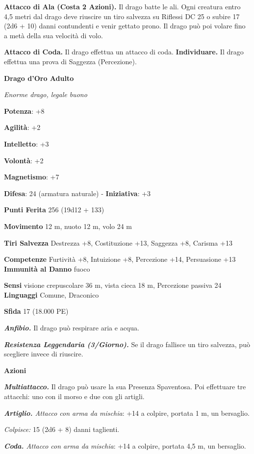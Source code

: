 \begin{multicols}{2}
\textbf{Attacco di Ala (Costa 2 Azioni).} Il drago batte le ali. Ogni
creatura entro 4,5 metri dal drago deve riuscire un tiro salvezza su Riflessi DC 25 o subire 17 (2d6 + 10) danni contundenti e venir gettato
prono. Il drago può poi volare fino a metà della sua velocità di volo.

\textbf{Attacco di Coda.} Il drago effettua un attacco di coda.
\textbf{Individuare.} Il drago effettua una prova di Saggezza
(Percezione).



\textbf{Drago d'Oro Adulto}

\emph{Enorme drago, legale buono}

\textbf{Potenza}: +8

\textbf{Agilità}: +2

\textbf{Intelletto}: +3

\textbf{Volontà}: +2

\textbf{Magnetismo}: +7

\textbf{Difesa}: 24 (armatura naturale) - \textbf{Iniziativa}: +3

\textbf{Punti Ferita} 256 (19d12 + 133)

\textbf{Movimento} 12 m, nuoto 12 m, volo 24 m

\textbf{Tiri Salvezza} Destrezza +8, Costituzione +13, Saggezza +8,
Carisma +13

\textbf{Competenze} Furtività +8, Intuizione +8, Percezione +14,
Persuasione +13 \textbf{Immunità al Danno} fuoco

\textbf{Sensi} visione crepuscolare 36 m, vista cieca 18 m, Percezione passiva
24 \textbf{Linguaggi} Comune, Draconico

\textbf{Sfida} 17 (18.000 PE)\smallskip

\emph{\textbf{Anfibio.}} Il drago può respirare aria e acqua.

\emph{\textbf{Resistenza Leggendaria (3/Giorno).}} Se il drago fallisce
un tiro salvezza, può scegliere invece di riuscire.

\smallskip\textbf{Azioni}

\emph{\textbf{Multiattacco.}} Il drago può usare la sua Presenza
Spaventosa. Poi effettuare tre attacchi: uno con il morso e due con gli
artigli.

\emph{\textbf{Artiglio.} Attacco con arma da mischia}: +14 a colpire,
portata 1 m, un bersaglio.

\emph{Colpisce:} 15 (2d6 + 8) danni taglienti.

\emph{\textbf{Coda.} Attacco con arma da mischia}: +14 a colpire,
portata 4,5 m, un bersaglio.


\end{multicols}
